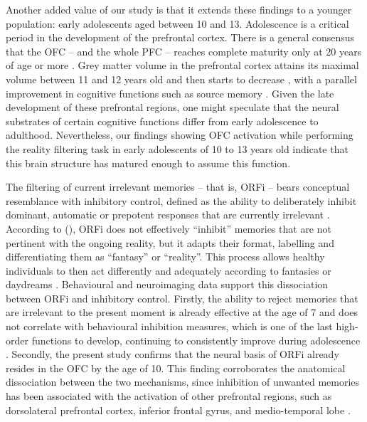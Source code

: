Another added value of our study is that it extends these findings to a younger population: early adolescents aged between 10 and 13. Adolescence is a critical period in the development of the prefrontal cortex. There is a general consensus that the OFC – and the whole PFC – reaches complete maturity only at 20 years of age or more \citep{Diamond2002, Gogtay2004, Galvan2006}. Grey matter volume in the prefrontal cortex attains its maximal volume between 11 and 12 years old and then starts to decrease \citep{Giedd1999}, with a parallel improvement in cognitive functions such as source memory \citep{Sowell2001}. Given the late development of these prefrontal regions, one might speculate that the neural substrates of certain cognitive functions differ from early adolescence to adulthood. Nevertheless, our findings showing OFC activation while performing the reality filtering task in early adolescents of 10 to 13 years old indicate that this brain structure has matured enough to assume this function. 

The filtering of current irrelevant memories – that is, ORFi – bears conceptual resemblance with inhibitory control, defined as the ability to deliberately inhibit dominant, automatic or prepotent responses that are currently irrelevant \citep{Harnishfeger1995, StClair-Thompson2006}. According to \citeauthor{Schnider2018} (\citeyear{Schnider2018}), ORFi does not effectively  “inhibit” memories that are not pertinent with the ongoing reality, but it adapts their format, labelling and differentiating them as “fantasy” or “reality”. This process allows healthy individuals to then act differently and adequately according to fantasies or daydreams \citep{Nahum2009, Schnider2018}. Behavioural and neuroimaging data support this dissociation between ORFi and inhibitory control. Firstly, the ability to reject memories that are irrelevant to the present moment is already effective at the age of 7 \citep{Liverani2017} and does not correlate with behavioural inhibition measures, which is one of the last high-order functions to develop, continuing to consistently improve during adolescence \cite{Luna2010}. Secondly, the present study confirms that the neural basis of ORFi already resides in the OFC by the age of 10. This finding corroborates the anatomical dissociation between the two mechanisms, since inhibition of unwanted memories has been associated with the activation of other prefrontal regions, such as dorsolateral prefrontal cortex, inferior frontal gyrus, and medio-temporal lobe \citep{Anderson2004, Luna2010}. 

